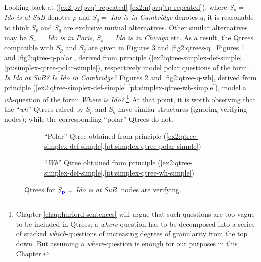 Looking back at (\ref{ex2:pv(pvq)-repeated}-\ref{ex2:n(pvq)tp-repeated}), where $S_p=$ \textit{Ido is at SuB} denotes $p$ and $S_q=$ \textit{Ido is in Cambridge} denotes $q$, it is reasonable to think $S_p$ and $S_q$ are exclusive mutual alternatives. Other similar alternatives may be $S_r=$ \textit{Ido is in Paris}, $S_s=$ \textit{Ido is in Chicago} etc. As a result, the Qtrees compatible with $S_p$ and $S_q$ are given in Figures \ref{fig2:qtrees-p} and \ref{fig2:qtrees-q}. Figures \ref{fig2:qtree-p-polar} and \ref{fig2:qtree-q-polar}, derived from principle (\ref{ex2:qtree-simplex-def-simple}.\ref{pt:simplex-qtree-polar-simple}), respectively model polar questions of the form: \textit{Is Ido at SuB?} \textit{Is Ido in Cambridge?} Figures \ref{fig2:qtree-p-wh} and \ref{fig2:qtree-q-wh}, derived from principle (\ref{ex2:qtree-simplex-def-simple}.\ref{pt:simplex-qtree-wh-simple}), model a \textit{wh}-question of the form: \textit{Where is Ido?}.\footnote{Chapter \ref{chap:hurford-sentences} will argue that such questions are too vague to be included in Qtrees; a \textit{where} question has to be decomposed into a series of stacked \textit{which}-questions of increasing degrees of granularity from the top down. But assuming a \textit{where}-question is enough for our purposes in this Chapter.} At that point, it is worth observing that the ``\textit{wh}'' Qtrees raised by $S_p$ and $S_q$ have similar structures (ignoring verifying nodes); while the corresponding ``polar'' Qtrees do not.


\begin{figure}[H]
	\centering
	\begin{subfigure}[b]{.3\linewidth}
		\centering
		\scalebox{1}{
			\begin{forest}
				[CS [\fbox{$\p$}][$\neg \p$]]
			\end{forest}
		}
		\caption{``Polar'' Qtree obtained from principle (\ref{ex2:qtree-simplex-def-simple}.\ref{pt:simplex-qtree-polar-simple})}\label{fig2:qtree-p-polar}
	\end{subfigure}\qquad
	\begin{subfigure}[b]{.3\linewidth}
		\centering
		\scalebox{1}{
			\begin{forest}
				[CS [\fbox{$\p$}][$\q$][$\r$][...]]
			\end{forest}
		}
		\caption{``\textit{Wh}'' Qtree obtained from principle (\ref{ex2:qtree-simplex-def-simple}.\ref{pt:simplex-qtree-wh-simple})}\label{fig2:qtree-p-wh}
	\end{subfigure}
	\caption{Qtrees for $S\protect_{\textbf{\textcolor{blue}{p}}}=$ \textit{Ido is at SuB}. \setlength{\fboxsep}{1pt} nodes are verifying.}
	\label{fig2:qtrees-p}
\end{figure}

